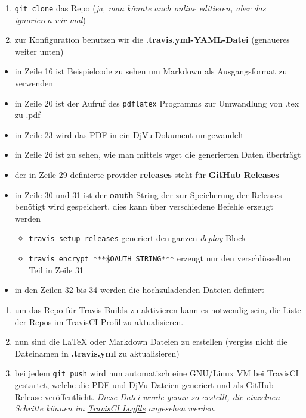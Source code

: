 \documentclass[]{article}
\providecommand{\tightlist}{%
  \setlength{\itemsep}{0pt}\setlength{\parskip}{0pt}}
\begin{document}
\begin{enumerate}
\def\labelenumi{\arabic{enumi}.}
\tightlist
\item
  \texttt{git\ clone} das Repo (\emph{ja, man könnte auch online
  editieren, aber das ignorieren wir mal})
\item
  zur Konfiguration benutzen wir die \textbf{.travis.yml-YAML-Datei}
  (genaueres weiter unten)
\end{enumerate}

\begin{itemize}
\tightlist
\item
  in Zeile 16 ist Beispielcode zu sehen um Markdown als Ausgangsformat
  zu verwenden
\item
  in Zeile 20 ist der Aufruf des \texttt{pdflatex} Programms zur
  Umwandlung von .tex zu .pdf
\item
  in Zeile 23 wird das PDF in ein
  \href{https://de.wikipedia.org/wiki/DjVu}{DjVu-Dokument} umgewandelt
\item
  in Zeile 26 ist zu sehen, wie man mittels wget die generierten Daten
  überträgt
\item
  der in Zeile 29 definierte provider \textbf{releases} steht für
  \textbf{GitHub Releases}
\item
  in Zeile 30 und 31 ist der \textbf{oauth} String der zur
  \href{http://docs.travis-ci.com/user/deployment/releases/}{Speicherung
  der Releases} benötigt wird gespeichert, dies kann über verschiedene
  Befehle erzeugt werden

  \begin{itemize}
  \tightlist
  \item
    \texttt{travis\ setup\ releases} generiert den ganzen
    \emph{deploy}-Block
  \item
    \texttt{travis\ encrypt\ ***\$OAUTH\_STRING***} erzeugt nur den
    verschlüsselten Teil in Zeile 31
  \end{itemize}
\item
  in den Zeilen 32 bis 34 werden die hochzuladenden Dateien definiert
\end{itemize}

\begin{enumerate}
\def\labelenumi{\arabic{enumi}.}
\tightlist
\item
  um das Repo für Travis Builds zu aktivieren kann es notwendig sein,
  die Liste der Repos im \href{https://travis-ci.org/profile}{TravisCI
  Profil} zu aktualisieren.
\item
  nun sind die LaTeX oder Markdown Dateien zu erstellen (vergiss nicht
  die Dateinamen in \textbf{.travis.yml} zu aktualisieren)
\item
  bei jedem \texttt{git\ push} wird nun automatisch eine GNU/Linux VM
  bei TravisCI gestartet, welche die PDF und DjVu Dateien generiert und
  als GitHub Release veröffentlicht. \emph{Diese Datei wurde genau so
  erstellt, die einzelnen Schritte können im
  \href{https://travis-ci.org/SimonWaldherr/testrepo}{TravisCI Logfile}
  angesehen werden.}
\end{enumerate}
\end{document}

